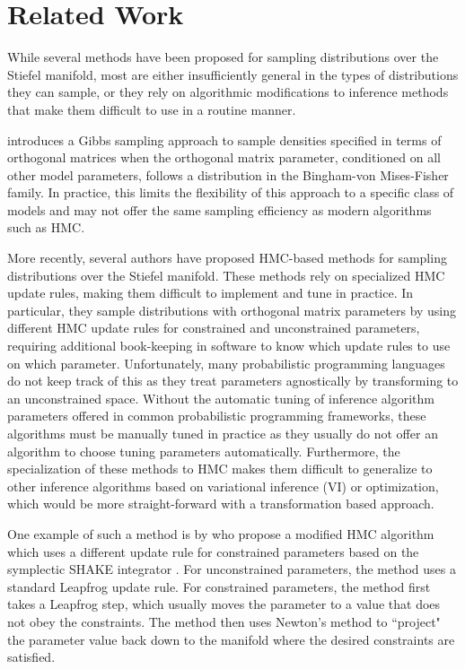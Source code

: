 \documentclass[ba]{imsart}
\numberwithin{equation}{section}
\theoremstyle{plain}
\begin{document}
\section{Related Work} \label{related}
While several methods have been proposed for sampling distributions over the Stiefel manifold, most are either insufficiently general in the types of distributions they can sample, or they rely on algorithmic modifications to inference methods that make them difficult to use in a routine manner.

\noindent \cite{hoff2009simulation} introduces a Gibbs sampling approach to sample densities specified in terms of orthogonal matrices when the orthogonal matrix parameter, conditioned on all other model parameters, follows a distribution in the Bingham-von Mises-Fisher family. In practice, this limits the flexibility of this approach to a specific class of models and may not offer the same sampling efficiency as modern algorithms such as HMC. 

\noindent More recently, several authors have proposed HMC-based methods for sampling distributions over the Stiefel manifold. These methods rely on specialized HMC update rules, making them difficult to implement and tune in practice. In particular, they sample distributions with orthogonal matrix parameters by using different HMC update rules for constrained and unconstrained parameters, requiring additional book-keeping in software to know which update rules to use on which parameter. Unfortunately, many probabilistic programming languages do not keep track of this as they treat parameters agnostically by transforming to an unconstrained space. Without the automatic tuning of inference algorithm parameters offered in common probabilistic programming frameworks, these algorithms must be manually tuned in practice as they usually do not offer an algorithm to choose tuning parameters automatically. Furthermore, the specialization of these methods to HMC makes them difficult to generalize to other inference algorithms based on variational inference (VI) or optimization, which would be more straight-forward with a transformation based approach.

\noindent One example of such a method is by \cite{brubaker2012family} who propose a modified HMC algorithm which uses a different update rule for constrained parameters based on the symplectic SHAKE integrator \citep{leimkuhler2004simulating}. For unconstrained parameters, the method uses a standard Leapfrog update rule. For constrained parameters, the method first takes a Leapfrog step, which usually moves the parameter to a value that does not obey the constraints. The method then uses Newton's method to ``project" the parameter value back down to the manifold where the desired constraints are satisfied.
\end{document}
